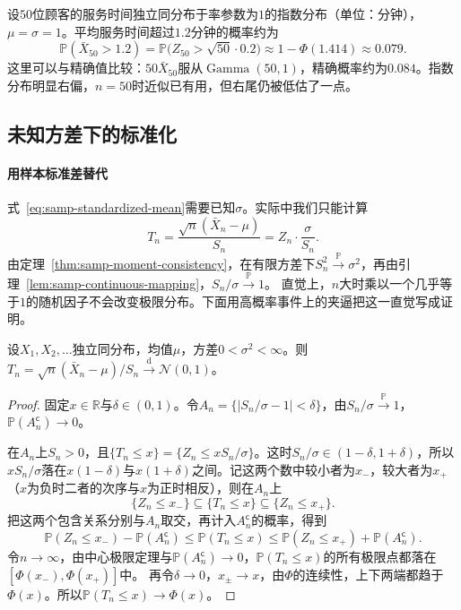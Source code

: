 \begin{example}[平均服务时间]
\label{ex:samp-exponential-clt}
设$50$位顾客的服务时间独立同分布于率参数为$1$的指数分布（单位：分钟），$\mu=\sigma=1$。平均服务时间超过$1.2$分钟的概率约为
\[
  \mathbb{P}(\bar X_{50}>1.2)=\mathbb{P}\bigl(Z_{50}>\sqrt{50}\cdot0.2\bigr)\approx1-\Phi(1.414)\approx0.079.
\]
这里可以与精确值比较：$50\bar X_{50}$服从$\operatorname{Gamma}(50,1)$，精确概率约为$0.084$。指数分布明显右偏，$n=50$时近似已有用，但右尾仍被低估了一点。
\end{example}

\subsection{未知方差下的标准化}

\paragraph{用样本标准差替代}
式~\eqref{eq:samp-standardized-mean}需要已知$\sigma$。实际中我们只能计算
\[
  T_n=\frac{\sqrt n(\bar X_n-\mu)}{S_n}=Z_n\cdot\frac{\sigma}{S_n}.
\]
由定理~\ref{thm:samp-moment-consistency}，在有限方差下$S_n^2\xrightarrow{\mathbb{P}}\sigma^2$，再由引理~\ref{lem:samp-continuous-mapping}，$S_n/\sigma\xrightarrow{\mathbb{P}}1$。
直觉上，$n$大时乘以一个几乎等于$1$的随机因子不会改变极限分布。下面用高概率事件上的夹逼把这一直觉写成证明。

\begin{theorem}[用样本标准差标准化]
\label{thm:samp-studentized-clt}
设$X_1,X_2,\dots$独立同分布，均值$\mu$，方差$0<\sigma^2<\infty$。则$T_n=\sqrt n(\bar X_n-\mu)/S_n\xrightarrow{\mathrm{d}}\mathcal N(0,1)$。
\end{theorem}

\begin{proof}
固定$x\in\mathbb{R}$与$\delta\in(0,1)$。令$A_n=\{|S_n/\sigma-1|<\delta\}$，由$S_n/\sigma\xrightarrow{\mathbb{P}}1$，$\mathbb{P}(A_n^{\mathsf c})\to0$。

在$A_n$上$S_n>0$，且$\{T_n\leq x\}=\{Z_n\leq xS_n/\sigma\}$。这时$S_n/\sigma\in(1-\delta,1+\delta)$，所以$xS_n/\sigma$落在$x(1-\delta)$与$x(1+\delta)$之间。记这两个数中较小者为$x_-$，较大者为$x_+$（$x$为负时二者的次序与$x$为正时相反），则在$A_n$上
\[
  \{Z_n\leq x_-\}\subseteq\{T_n\leq x\}\subseteq\{Z_n\leq x_+\}.
\]
把这两个包含关系分别与$A_n$取交，再计入$A_n^{\mathsf c}$的概率，得到
\[
  \mathbb{P}(Z_n\leq x_-)-\mathbb{P}(A_n^{\mathsf c})\leq\mathbb{P}(T_n\leq x)\leq\mathbb{P}(Z_n\leq x_+)+\mathbb{P}(A_n^{\mathsf c}).
\]
令$n\to\infty$，由中心极限定理与$\mathbb{P}(A_n^{\mathsf c})\to0$，$\mathbb{P}(T_n\leq x)$的所有极限点都落在$[\Phi(x_-),\Phi(x_+)]$中。
再令$\delta\to0$，$x_\pm\to x$，由$\Phi$的连续性，上下两端都趋于$\Phi(x)$。所以$\mathbb{P}(T_n\leq x)\to\Phi(x)$。
\end{proof}

